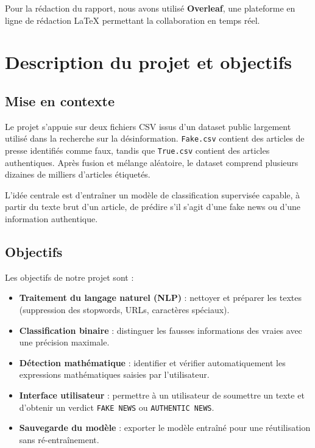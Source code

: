 \documentclass[a4paper, 12pt, twoside]{article}
\begin{document}
Pour la rédaction du rapport, nous avons utilisé \textbf{Overleaf}, une
plateforme en ligne de rédaction \LaTeX{} permettant la collaboration en
temps réel.

\section{Description du projet et objectifs}

\subsection{Mise en contexte}

Le projet s'appuie sur deux fichiers CSV issus d'un dataset public largement
utilisé dans la recherche sur la désinformation. \texttt{Fake.csv} contient
des articles de presse identifiés comme faux, tandis que \texttt{True.csv}
contient des articles authentiques. Après fusion et mélange aléatoire, le
dataset comprend plusieurs dizaines de milliers d'articles étiquetés.

L'idée centrale est d'entraîner un modèle de classification supervisée
capable, à partir du texte brut d'un article, de prédire s'il s'agit d'une
fake news ou d'une information authentique.

\subsection{Objectifs}

Les objectifs de notre projet sont :

\begin{itemize}
  \item \textbf{Traitement du langage naturel (NLP)} : nettoyer et préparer
        les textes (suppression des stopwords, URLs, caractères spéciaux).
  \item \textbf{Classification binaire} : distinguer les fausses informations
        des vraies avec une précision maximale.
  \item \textbf{Détection mathématique} : identifier et vérifier
        automatiquement les expressions mathématiques saisies par l'utilisateur.
  \item \textbf{Interface utilisateur} : permettre à un utilisateur de
        soumettre un texte et d'obtenir un verdict
        \texttt{FAKE NEWS} ou \texttt{AUTHENTIC NEWS}.
  \item \textbf{Sauvegarde du modèle} : exporter le modèle entraîné pour
        une réutilisation sans ré-entraînement.
\end{itemize}
\end{document}

